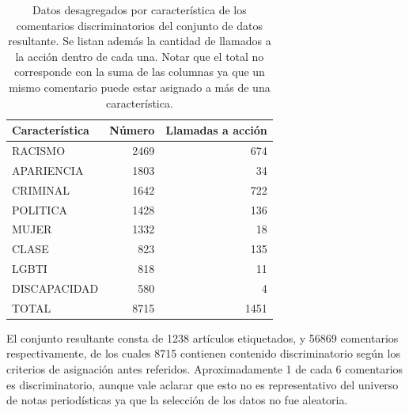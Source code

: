 \begin{table}
    \centering
    \begin{tabular}{lrr}
        \toprule
        Característica &  Número &  Llamadas a acción \\
        \midrule
        RACISMO        &   \num{2469} & \num{ 674} \\
        APARIENCIA     &   \num{1803} & \num{  34} \\
        CRIMINAL       &   \num{1642} & \num{ 722} \\
        POLITICA       &   \num{1428} & \num{ 136} \\
        MUJER          &   \num{1332} & \num{  18} \\
        CLASE          &   \num{ 823} & \num{ 135} \\
        LGBTI          &   \num{ 818} & \num{  11} \\
        DISCAPACIDAD   &   \num{ 580} & \num{   4} \\
        TOTAL          &   \num{8715} & \num{1451} \\
        \bottomrule
    \end{tabular}
    \caption{Datos desagregados por característica de los comentarios discriminatorios del conjunto de datos resultante. Se listan además la cantidad de llamados a la acción dentro de cada una. Notar que el total no corresponde con la suma de las columnas ya que un mismo comentario puede estar asignado a más de una característica.}
    \label{tab:dataset_figures}

\end{table}

El conjunto resultante consta de \num{1238} artículos etiquetados, y \num{56869} comentarios respectivamente, de los cuales \num{8715} contienen contenido discriminatorio según los criterios de asignación antes referidos. Aproximadamente 1 de cada 6 comentarios es discriminatorio, aunque vale aclarar que esto no es representativo del universo de notas periodísticas ya que la selección de los datos no fue aleatoria.

